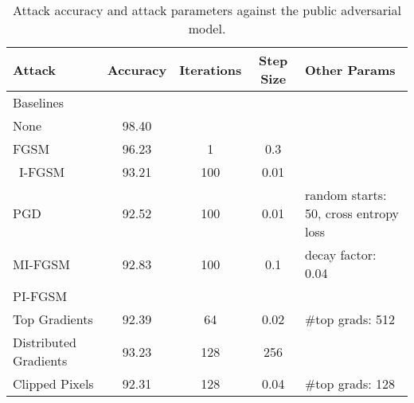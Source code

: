 \begin{table}
    \begin{center}
        \begin{tabular}{l|c|c|c|l}
            \hline
            Attack & Accuracy & Iterations & Step Size & Other Params\\
            \hline
            Baselines \\
            \hline
            None & 98.40 &&& \\
            FGSM & 96.23 & 1 & 0.3 & \\\
            I-FGSM & 93.21 & 100 & 0.01 & \\
            PGD & 92.52 & 100 & 0.01 & random starts: 50, cross entropy loss \\
            MI-FGSM & 92.83 & 100 & 0.1 & decay factor: 0.04 \\
            \hline
            PI-FGSM \\
            \hline
            Top Gradients & 92.39 & 64 & 0.02 & \#top grads: 512\\
            Distributed Gradients & 93.23 & 128 & 256 & \\
            Clipped Pixels & 92.31 & 128 & 0.04 & \#top grads: 128
        \end{tabular}
    \end{center}
    \caption{\label{tab:res_table}Attack accuracy and attack parameters against the public adversarial model.}
\end{table}